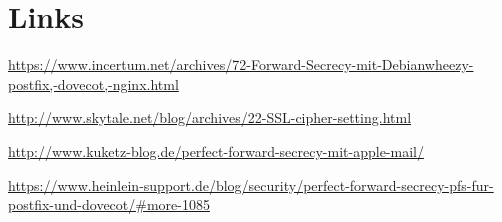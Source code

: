 \section{Links}



\url{https://www.incertum.net/archives/72-Forward-Secrecy-mit-Debianwheezy-postfix,-dovecot,-nginx.html}

\url{http://www.skytale.net/blog/archives/22-SSL-cipher-setting.html}

\url{http://www.kuketz-blog.de/perfect-forward-secrecy-mit-apple-mail/}

\url{https://www.heinlein-support.de/blog/security/perfect-forward-secrecy-pfs-fur-postfix-und-dovecot/#more-1085}


